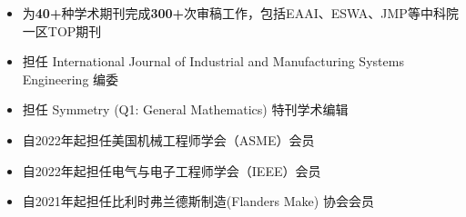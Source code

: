 \documentclass{resume}
\begin{document}


\begin{itemize}[parsep=0.5ex]
  \item 为\textbf{40+}种学术期刊完成\textbf{300+}次审稿工作，包括EAAI、ESWA、JMP等中科院一区TOP期刊
  \item 担任 International Journal of Industrial and Manufacturing Systems Engineering 编委
  \item 担任 Symmetry (Q1: General Mathematics) 特刊学术编辑
  \item 自2022年起担任美国机械工程师学会（ASME）会员
  \item 自2022年起担任电气与电子工程师学会（IEEE）会员
  \item 自2021年起担任比利时弗兰德斯制造(Flanders Make) 协会会员
\end{itemize}

\vspace{5mm}
\end{document}

